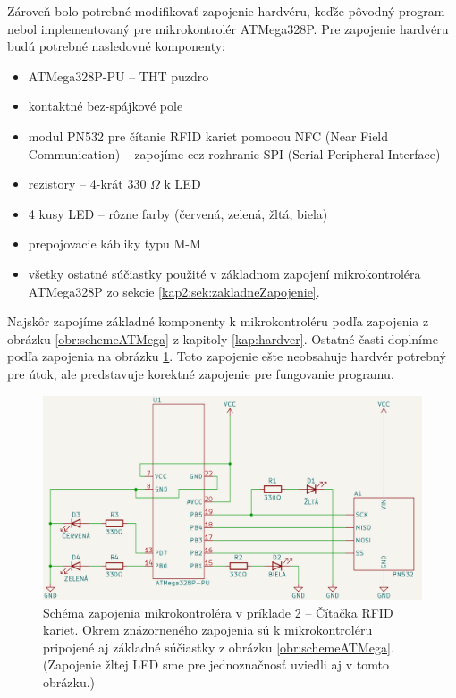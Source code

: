 Zároveň bolo potrebné modifikovať zapojenie hardvéru, keďže pôvodný program nebol implementovaný pre mikrokontrolér ATMega328P. Pre zapojenie hardvéru budú potrebné nasledovné komponenty:
\begin{itemize}
    \item ATMega328P-PU -- THT puzdro
    \item kontaktné bez-spájkové pole
    \item modul PN532 pre čítanie RFID kariet pomocou NFC (Near Field Communication) -- zapojíme cez rozhranie SPI (Serial Peripheral Interface)
    \item rezistory -- 4-krát 330 $\Omega$ k LED
    \item 4 kusy LED -- rôzne farby (červená, zelená, žltá, biela)
    \item prepojovacie kábliky typu M-M
    \item všetky ostatné súčiastky použité v základnom zapojení mikrokontroléra ATMega328P zo sekcie \ref{kap2:sek:zakladneZapojenie}.
\end{itemize}
Najskôr zapojíme základné komponenty k mikrokontroléru podľa zapojenia z obrázku \ref{obr:schemeATMega} z kapitoly \ref{kap:hardver}. Ostatné časti doplníme podľa zapojenia na obrázku \ref{obr:schemeRFID}. Toto zapojenie ešte neobsahuje hardvér potrebný pre útok, ale predstavuje korektné zapojenie pre fungovanie programu.

\begin{figure}
    \centerline{\includegraphics[width=1\textwidth]{images/schemeRFID.png}}
    \caption[Schéma zapojenia mikrokontroléra v príklade 2]{Schéma zapojenia mikrokontroléra v príklade 2 -- Čítačka RFID kariet. Okrem znázorneného zapojenia sú k mikrokontroléru pripojené aj základné súčiastky z obrázku \ref{obr:schemeATMega}. (Zapojenie žltej LED sme pre jednoznačnosť uviedli aj v tomto obrázku.)}
    \label{obr:schemeRFID}
\end{figure}

